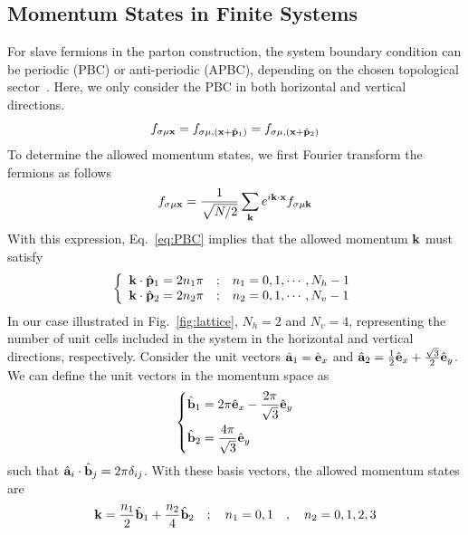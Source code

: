 \subsection{Momentum States in Finite Systems}
For slave fermions in the parton construction, the system boundary condition can be periodic (PBC) or anti-periodic (APBC), depending on the chosen topological sector~\cite {Kou-Levin-Wen_2008}. Here, we only consider the PBC in both horizontal and vertical directions. 
\begin{equation}\label{eq:PBC}
    f_{\sigma\mu\mathbf{x}} = f_{\sigma\mu,(\mathbf{x} + \hat{\mathbf{p}}_1)} = f_{\sigma\mu,(\mathbf{x} + \hat{\mathbf{p}}_2)}
\end{equation}
To determine the allowed momentum states, we first Fourier transform the fermions as follows
\[
f_{\sigma\mu\mathbf{x}} = \frac{1}{\sqrt{N/2}}\sum_{\mathbf{k}} e^{i\mathbf{k}\cdot\mathbf{x}} f_{\sigma\mu\mathbf{k}}
\]
With this expression, Eq.~\eqref{eq:PBC} implies that the allowed momentum $\mathbf{k}$ must satisfy
\begin{equation}\label{eq:condition-init}
    \left\{
    \begin{array}{lll}
        \mathbf{k}\cdot\hat{\mathbf{p}}_1 = 2n_1\pi & ; & n_1 = 0,1,\cdots,N_h-1\\
        \mathbf{k}\cdot\hat{\mathbf{p}}_2 = 2n_2\pi & ; & n_2 = 0,1,\cdots,N_v-1
    \end{array}
    \right.
\end{equation}
In our case illustrated in Fig.~\ref{fig:lattice}, $N_h=2$ and $N_v = 4$, representing the number of unit cells included in the system in the horizontal and vertical directions, respectively. Consider the unit vectors $\hat{\mathbf{a}}_1 = \hat{\mathbf{e}}_x$ and $\hat{\mathbf{a}}_2 = \frac{1}{2}\hat{\mathbf{e}}_x + \frac{\sqrt{3}}{2}\hat{\mathbf{e}}_y$. We can define the unit vectors in the momentum space as 
\[
\left\{
\begin{aligned}
& \hat{\mathbf{b}}_1 =  2\pi\hat{\mathbf{e}}_x - \frac{2\pi}{\sqrt{3}}\hat{\mathbf{e}}_y\\
& \hat{\mathbf{b}}_2 = \frac{4\pi}{\sqrt{3}}\hat{\mathbf{e}}_y
\end{aligned}
\right.
\]
such that $\hat{\mathbf{a}}_i\cdot\hat{\mathbf{b}}_j = 2\pi \delta_{ij}$. With these basis vectors, the allowed momentum states are
\begin{equation}\label{eq:allowed-momentum}
    \mathbf{k} = \frac{n_1}{2}\hat{\mathbf{b}}_1 + \frac{n_2}{4}\hat{\mathbf{b}}_2 \quad ; \quad n_1=0,1 \quad,\quad n_2=0,1,2,3
\end{equation}


